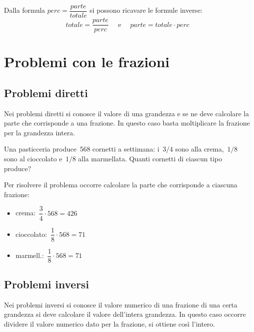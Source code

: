 Dalla formula \(perc = \dfrac{parte}{totale}\) si possono ricavare le 
formule inverse: 
\[totale = \dfrac{parte}{perc} \quad \text{ e } \quad 
  parte = totale \cdot perc\]


\section{Problemi con le frazioni}
\label{sec:razionali_problemi}


\subsection{Problemi diretti}
Nei problemi diretti si conosce il valore di una grandezza e se ne deve 
calcolare la parte che corrisponde a una frazione. 
In questo caso basta moltiplicare la frazione per la grandezza intera.

 \begin{esempio}{}{}
Una pasticceria produce~568 cornetti a settimana: i~\(3/4\) sono alla 
crema,~\(1/8\) sono al cioccolato e~\(1/8\) alla marmellata. 
Quanti cornetti di ciascun tipo produce?

Per risolvere il problema occorre calcolare la parte che corrisponde a 
ciascuna frazione:

\begin{multicols}{3}
\begin{itemize} [noitemsep]
\item crema:~\(\dfrac{3}{4}\cdot 568 =426\)
\item cioccolato:~\(\dfrac{1}{8}\cdot 568 =71\)
\item marmell.:~\(\dfrac{1}{8}\cdot 568 =71\)
\end{itemize}
\end{multicols}
 \end{esempio}

\subsection{Problemi inversi}

Nei problemi inversi si conosce il valore numerico di una frazione di una 
certa grandezza si deve calcolare il valore dell'intera grandezza.
In questo caso occorre dividere il valore numerico dato per la frazione, 
si ottiene così l'intero.

